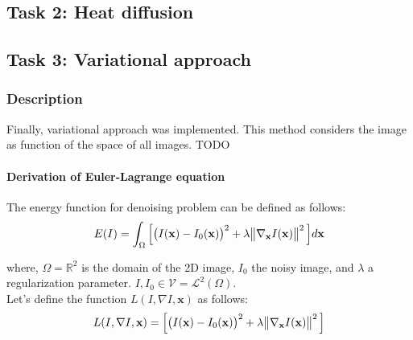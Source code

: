 \documentclass[paper=a4, fontsize=11pt]{scrartcl} %
\numberwithin{equation}{section} %
\numberwithin{figure}{section} %
\numberwithin{table}{section} %
\renewcommand{\vec}[1]{\mathbf{#1}}
\begin{document}

\subsection{Task 2: Heat diffusion}


\subsection{Task 3: Variational approach}


\subsubsection{Description}

Finally, variational approach was implemented. This method considers the image as function of the space of all images. 
TODO

\paragraph{Derivation of Euler-Lagrange equation}

The energy function for denoising problem can be defined as follows:
\begin{align}
	E(I) = \int_{\Omega}\Big[\big(I(\vec{x}) - I_0(\vec{x})\big)^2 + \lambda \norm{\nabla_{\vec{x}} I(\vec{x})}^2 \Big]	d\vec{x}
\end{align}

where, $\Omega = \mathbb{R}^2$ is the domain of the 2D image, $I_0$ the noisy image, and $\lambda$ a regularization parameter. $I, I_0 \in \mathcal{V} = \mathcal{L}^2(\Omega)$. \\

Let's define the function $L(I, \nabla I, \vec{x})$ as follows: 
\begin{align}
	L(I, \nabla I, \vec{x}) = \Big[\big(I(\vec{x}) - I_0(\vec{x})\big)^2 + \lambda \norm{\nabla_{\vec{x}} I(\vec{x})}^2 \Big]
\end{align}
\end{document}
